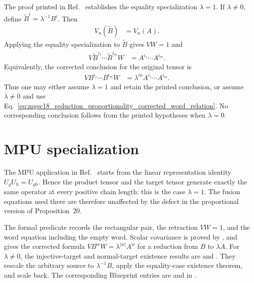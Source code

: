 \documentclass{article}
\begin{document}
The proof printed in Ref.~\cite{Molnar2018SemiInjective} establishes the
equality specialization $\lambda=1$.  If $\lambda\ne0$, define
$\widetilde B^i=\lambda^{-1}B^i$.  Then
\begin{align}
    V_n(\widetilde B)
        &=V_n(A).
    \label{eq:mgsc18_reduction_proportionality_rescaled_state_equality}
\end{align}
Applying the equality specialization to $\widetilde B$ gives $VW=1$ and
\begin{align}
    V\widetilde B^{i_1}\cdots\widetilde B^{i_m}W
        &=A^{i_1}\cdots A^{i_m}.
    \label{eq:mgsc18_reduction_proportionality_rescaled_word_relation}
\end{align}
Equivalently, the corrected conclusion for the original tensor is
\begin{align}
    VB^{i_1}\cdots B^{i_m}W
        &=\lambda^m A^{i_1}\cdots A^{i_m}.
    \label{eq:mgsc18_reduction_proportionality_corrected_word_relation}
\end{align}
Thus one may either assume $\lambda=1$ and retain the printed conclusion, or
assume $\lambda\ne0$ and use
Eq.~\ref{eq:mgsc18_reduction_proportionality_corrected_word_relation}.  No
corresponding conclusion follows from the printed hypotheses when
$\lambda=0$.

\section{MPU specialization}

The MPU application in Ref.~\cite{FrancoRubio2025MPUGauging} starts from the
linear representation identity $U_gU_h=U_{gh}$.  Hence the product tensor and
the target tensor generate exactly the same operator at every positive chain
length: this is the case $\lambda=1$.  The fusion equations used there are
therefore unaffected by the defect in the proportional version of
Proposition~20.

The formal predicate  records the rectangular
pair, the retraction $VW=1$, and the word equation including the empty word.
Scalar covariance is proved by , and
 gives the corrected formula
$VB^wW=\lambda^{|w|}A^w$ for a reduction from $B$ to $\lambda A$.  For
$\lambda\ne0$, the injective-target and normal-target existence results are
and
.
They rescale the arbitrary source to $\lambda^{-1}B$, apply the equality-case
existence theorem, and scale back.  The corresponding Blueprint entries are
 and
 in
.
\end{document}
